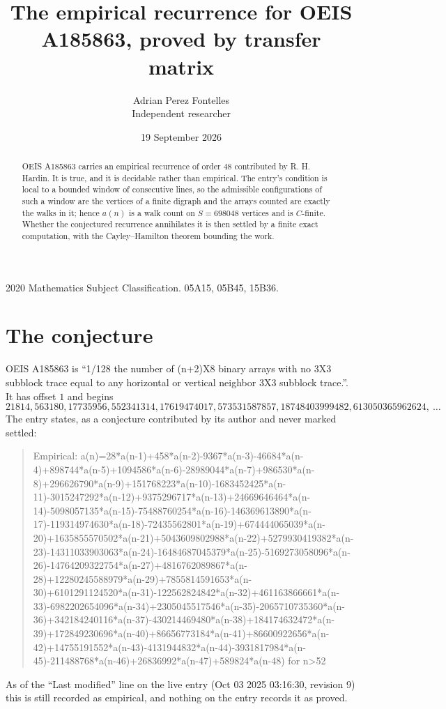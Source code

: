 \documentclass[11pt,a4paper]{article}
\title{The empirical recurrence for OEIS A185863, proved by transfer matrix}
\author{Adrian Perez Fontelles\\ \small Independent researcher}
\date{19 September 2026}
\theoremstyle{plain}
\theoremstyle{definition}
\begin{document}
\maketitle

\begin{abstract}
OEIS A185863 carries an empirical recurrence of order $48$ contributed by R. H. Hardin. It is
true, and it is decidable rather than empirical. The entry's condition is local to a bounded window of consecutive lines, so
the admissible configurations of such a window are the vertices of a finite digraph and the
arrays counted are exactly the walks in it; hence $a(n)$ is a walk count on $S=698048$ vertices
and is $C$-finite. Whether the conjectured recurrence annihilates it is then settled by a
finite exact computation, with the Cayley--Hamilton theorem bounding the work.
\end{abstract}

\noindent\small 2020 Mathematics Subject Classification. 05A15, 05B45, 15B36.\normalsize

\section{The conjecture}

OEIS A185863 is ``1/128 the number of (n+2)X8 binary arrays with no 3X3 subblock trace equal to any horizontal or vertical neighbor 3X3 subblock trace.''. It has offset $1$ and begins
\[
21814, 563180, 17735956, 552341314, 17619474017, 573531587857, 18748403999482, 613050365962624,\ \dots
\]
The entry states, as a conjecture contributed by its author and never marked settled:
\begin{quote}\raggedright\small
Empirical: a(n)=28*a(n-1)+458*a(n-2)-9367*a(n-3)-46684*a(n-4)+898744*a(n-5)+1094586*a(n-6)-28989044*a(n-7)+986530*a(n-8)+296626790*a(n-9)+151768223*a(n-10)-1683452425*a(n-11)-3015247292*a(n-12)+9375296717*a(n-13)+24669646464*a(n-14)-5098057135*a(n-15)-75488760254*a(n-16)-146369613890*a(n-17)-119314974630*a(n-18)-72435562801*a(n-19)+674444065039*a(n-20)+1635855570502*a(n-21)+5043609802988*a(n-22)+5279930419382*a(n-23)-14311033903063*a(n-24)-16484687045379*a(n-25)-5169273058096*a(n-26)-14764209322754*a(n-27)+4816762089867*a(n-28)+12280245588979*a(n-29)+7855814591653*a(n-30)+6101291124520*a(n-31)-122562824842*a(n-32)+461163866661*a(n-33)-6982202654096*a(n-34)+2305045517546*a(n-35)-2065710735360*a(n-36)+342184240116*a(n-37)-430214469480*a(n-38)+184174632472*a(n-39)+172849230696*a(n-40)+86656773184*a(n-41)+86600922656*a(n-42)+14755191552*a(n-43)-4131944832*a(n-44)-3931817984*a(n-45)-211488768*a(n-46)+26836992*a(n-47)+589824*a(n-48) for n>52
\end{quote}
As of the ``Last modified'' line on the live entry (Oct 03 2025 03:16:30, revision 9) this is still
recorded as empirical, and nothing on the entry records it as proved.
\end{document}
